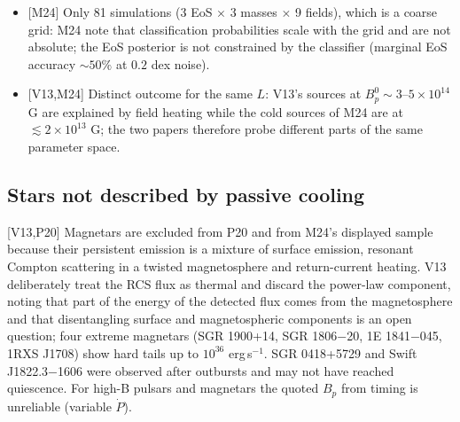 \documentclass[11pt,a4paper]{article}
\newcommand{\src}[1]{\textsf{[#1]}}
\begin{document}
\begin{itemize}[leftmargin=1.2em,itemsep=0pt]
\item \src{M24} Only 81 simulations (3 EoS $\times$ 3 masses $\times$ 9 fields), which is a coarse grid: M24 note that classification probabilities scale with the grid and are not absolute; the EoS posterior is not constrained by the classifier (marginal EoS accuracy $\sim50\%$ at $0.2$ dex noise).
\item \src{V13,M24} Distinct outcome for the same $L$: V13's sources at $B_p^0\sim3$--$5\times10^{14}$ G are explained by field heating while the cold sources of M24 are at $\lesssim2\times10^{13}$ G; the two papers therefore probe different parts of the same parameter space.
\end{itemize}

\subsection{Stars not described by passive cooling}
\src{V13,P20} Magnetars are excluded from P20 and from M24's displayed sample because their persistent emission is a mixture of surface emission, resonant Compton scattering in a twisted magnetosphere and return-current heating. V13 deliberately treat the RCS flux as thermal and discard the power-law component, noting that part of the energy of the detected flux comes from the magnetosphere and that disentangling surface and magnetospheric components is an open question; four extreme magnetars (SGR 1900+14, SGR 1806$-$20, 1E 1841$-$045, 1RXS J1708) show hard tails up to $10^{36}$ erg\,s$^{-1}$. SGR 0418+5729 and Swift J1822.3$-$1606 were observed after outbursts and may not have reached quiescence. For high-B pulsars and magnetars the quoted $B_p$ from timing is unreliable (variable $\dot P$).
\end{document}
